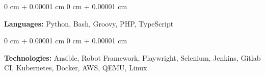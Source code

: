 \documentclass[10pt, letterpaper]{article}
\newenvironment{onecolentry}{
    \begin{adjustwidth}{
        0 cm + 0.00001 cm
    }{
        0 cm + 0.00001 cm
    }
}{
    \end{adjustwidth}
} %
\begin{document}
        \begin{onecolentry}
            \textbf{Languages:} Python, Bash, Groovy, PHP, TypeScript
        \end{onecolentry}

        \vspace{0.2 cm}

        \begin{onecolentry}
            \textbf{Technologies:} Ansible, Robot Framework, Playwright, Selenium, Jenkins, Gitlab CI, Kubernetes, Docker, AWS, QEMU, Linux
        \end{onecolentry}
\end{document}
